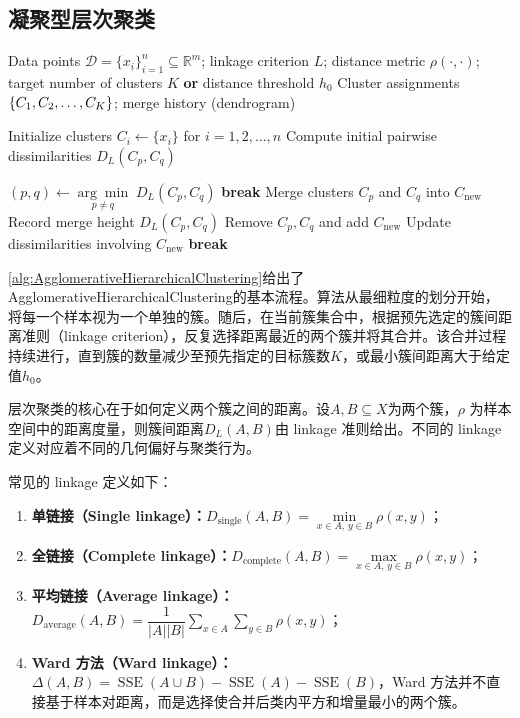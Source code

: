 \subsection{凝聚型层次聚类}
\begin{algorithm}[H]
	\caption{Agglomerative Hierarchical Clustering}
	\label{alg:AgglomerativeHierarchicalClustering}
	\begin{algorithmic}[1]
		\Require Data points $\mathcal{D}=\{x_i\}_{i=1}^{n}\subseteq\mathbb{R}^m$;
		linkage criterion $L$;
		distance metric $\rho(\cdot,\cdot)$;
		target number of clusters $K$ \textbf{or} distance threshold $h_0$
		\Ensure Cluster assignments $\{C_1, C_2, \dots, C_{K}\}$;
		merge history (dendrogram)
		
		\State Initialize clusters $C_i \gets \{x_i\}$ for $i=1,2,\dots,n$
		\State Compute initial pairwise dissimilarities $D_L(C_p,C_q)$
		
		\State $(p,q)\gets \underset{p\neq q}{\arg\min}\;D_L(C_p,C_q)$
		\State \textbf{break}
		\EndIf
		\State Merge clusters $C_p$ and $C_q$ into $C_{\text{new}}$
		\State Record merge height $D_L(C_p,C_q)$
		\State Remove $C_p,C_q$ and add $C_{\text{new}}$
		\State Update dissimilarities involving $C_{\text{new}}$
		\State \textbf{break}
		\EndIf
		\EndWhile
	\end{algorithmic}
\end{algorithm}
\cref{alg:AgglomerativeHierarchicalClustering}给出了\gls{AgglomerativeHierarchicalClustering}的基本流程。算法从最细粒度的划分开始，将每一个样本视为一个单独的簇。随后，在当前簇集合中，根据预先选定的簇间距离准则（linkage criterion），反复选择距离最近的两个簇并将其合并。该合并过程持续进行，直到簇的数量减少至预先指定的目标簇数$K$，或最小簇间距离大于给定值$h_0$。\par
层次聚类的核心在于如何定义两个簇之间的距离。设$A,B\subseteq X$为两个簇，$\rho$ 为样本空间中的距离度量，则簇间距离$D_L(A,B)$由 linkage 准则给出。不同的 linkage 定义对应着不同的几何偏好与聚类行为。\par
常见的 linkage 定义如下：
\begin{enumerate}
	\item \textbf{单链接（Single linkage）：}$D_{\text{single}}(A,B)=\min\limits_{x\in A,\,y\in B} \rho(x,y)$；
	\item \textbf{全链接（Complete linkage）：}$D_{\text{complete}}(A,B)=\max\limits_{x\in A,\,y\in B} \rho(x,y)$；
	\item \textbf{平均链接（Average linkage）：}$D_{\text{average}}(A,B)=\dfrac{1}{|A||B|}\sum\limits_{x\in A}\sum\limits_{y\in B}\rho(x,y)$；
	\item \textbf{Ward 方法（Ward linkage）：}
	$\Delta(A,B)=\operatorname{SSE}(A\cup B)-\operatorname{SSE}(A)-\operatorname{SSE}(B)$，Ward 方法并不直接基于样本对距离，而是选择使合并后类内平方和增量最小的两个簇。
\end{enumerate}

